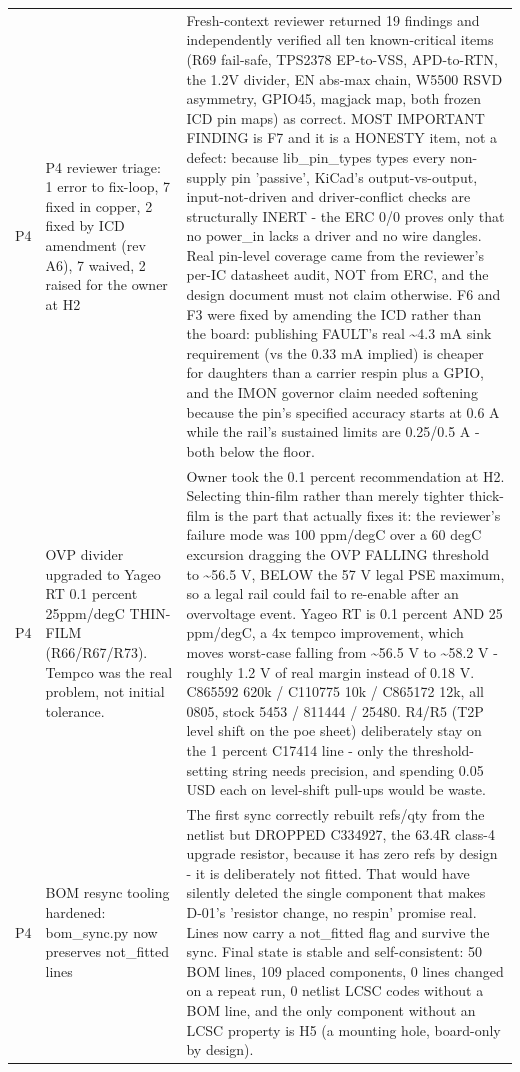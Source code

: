 \documentclass[11pt,a4paper]{article}
\begin{document}
{\begin{longtable}{lp{5.2cm}p{7.2cm}}
P4 & P4 reviewer triage: 1 error to fix-loop, 7 fixed in copper, 2 fixed by ICD amendment (rev A6), 7 waived, 2 raised for the owner at H2 & Fresh-context reviewer returned 19 findings and independently verified all ten known-critical items (R69 fail-safe, TPS2378 EP-to-VSS, APD-to-RTN, the 1.2V divider, EN abs-max chain, W5500 RSVD asymmetry, GPIO45, magjack map, both frozen ICD pin maps) as correct. MOST IMPORTANT FINDING is F7 and it is a HONESTY item, not a defect: because lib\_pin\_types types every non-supply pin 'passive', KiCad's output-vs-output, input-not-driven and driver-conflict checks are structurally INERT - the ERC 0/0 proves only that no power\_in lacks a driver and no wire dangles. Real pin-level coverage came from the reviewer's per-IC datasheet audit, NOT from ERC, and the design document must not claim otherwise. F6 and F3 were fixed by amending the ICD rather than the board: publishing FAULT's real \textasciitilde{}4.3 mA sink requirement (vs the 0.33 mA implied) is cheaper for daughters than a carrier respin plus a GPIO, and the IMON governor claim needed softening because the pin's specified accuracy starts at 0.6 A while the rail's sustained limits are 0.25/0.5 A - both below the floor. \\
P4 & OVP divider upgraded to Yageo RT 0.1 percent 25ppm/degC THIN-FILM (R66/R67/R73). Tempco was the real problem, not initial tolerance. & Owner took the 0.1 percent recommendation at H2. Selecting thin-film rather than merely tighter thick-film is the part that actually fixes it: the reviewer's failure mode was 100 ppm/degC over a 60 degC excursion dragging the OVP FALLING threshold to \textasciitilde{}56.5 V, BELOW the 57 V legal PSE maximum, so a legal rail could fail to re-enable after an overvoltage event. Yageo RT is 0.1 percent AND 25 ppm/degC, a 4x tempco improvement, which moves worst-case falling from \textasciitilde{}56.5 V to \textasciitilde{}58.2 V - roughly 1.2 V of real margin instead of 0.18 V. C865592 620k / C110775 10k / C865172 12k, all 0805, stock 5453 / 811444 / 25480. R4/R5 (T2P level shift on the poe sheet) deliberately stay on the 1 percent C17414 line - only the threshold-setting string needs precision, and spending 0.05 USD each on level-shift pull-ups would be waste. \\
P4 & BOM resync tooling hardened: bom\_sync.py now preserves not\_fitted lines & The first sync correctly rebuilt refs/qty from the netlist but DROPPED C334927, the 63.4R class-4 upgrade resistor, because it has zero refs by design - it is deliberately not fitted. That would have silently deleted the single component that makes D-01's 'resistor change, no respin' promise real. Lines now carry a not\_fitted flag and survive the sync. Final state is stable and self-consistent: 50 BOM lines, 109 placed components, 0 lines changed on a repeat run, 0 netlist LCSC codes without a BOM line, and the only component without an LCSC property is H5 (a mounting hole, board-only by design). \\

\end{longtable}}
\end{document}
